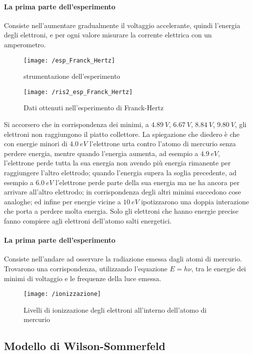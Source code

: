 \paragraph{La prima parte dell'esperimento}
Consiste nell'aumentare gradualmente il voltaggio accelerante, quindi l'energia degli elettroni, e per ogni valore misurare la corrente elettrica con un amperometro.
\begin{figure}[h]
\centering
\texttt{[image: /esp\_Franck\_Hertz]}
\caption{strumentazione dell'esperimento}
\end{figure}
\begin{figure}[h]
\centering
\texttt{[image: /ris2\_esp\_Franck\_Hertz]}
\caption{Dati ottenuti nell'esperimento di Franck-Hertz}
\end{figure}
Si accorsero che in corrispondenza dei minimi, a $\SI{4.89}{V}$, $\SI{6.67}{V}$, $\SI{8.84}{V}$, $\SI{9.80}{V}$, gli elettroni non raggiungono il piatto collettore.
La spiegazione che diedero è che con energie minori di $\SI{4.0}{eV}$ l'elettrone urta contro l'atomo di mercurio senza perdere energia, mentre quando l'energia aumenta, ad esempio a $\SI{4.9}{eV}$, l'elettrone perde tutta la sua energia non avendo più energia rimanente per raggiungere l'altro elettrodo; quando l'energia supera la soglia precedente, ad esempio a $\SI{6.0}{eV}$ l'elettrone perde parte della sua energia ma ne ha ancora per arrivare all'altro elettrodo; in corrispondenza degli altri minimi succedono cose analoghe; ed infine per energie vicine a $\SI{10}{eV}$ ipotizzarono una doppia interazione che porta a perdere molta energia.
Solo gli elettroni che hanno energie precise fanno compiere agli elettroni dell'atomo salti energetici.
\paragraph{La prima parte dell'esperimento} 
Consiste nell'andare ad osservare la radiazione emessa dagli atomi di mercurio.
Trovarono una corrispondenza, utilizzando l'equazione $E=h\nu$, tra le energie dei minimi di voltaggio e le frequenze della luce emessa.
\begin{figure}[h]
\centering
\texttt{[image: /ionizzazione]}
\caption{Livelli di ionizzazione degli elettroni all'interno dell'atomo di mercurio}
\end{figure}


\subsection{Modello di Wilson-Sommerfeld}








